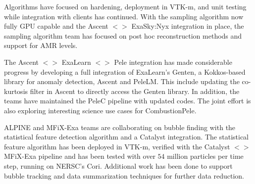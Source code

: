 
Algorithms have  focused on hardening, deployment in VTK-m, and unit testing while integration with clients has continued.  With the sampling algorithm now fully GPU capable and the Ascent $<>$ ExaSky:Nyx integration in place, the sampling algorithm team has focused on post hoc reconstruction methods and support for AMR levels.

The Ascent $<>$ ExaLearn $<>$ Pele integration has made considerable progress by developing a full integration of ExaLearn's Genten, a Kokkos-based library for anomaly detection, Ascent and PeleLM.  This include updating the co-kurtosis filter in Ascent to directly access the Genten library.  In addition, the teams have maintained the PeleC pipeline with updated codes.  The joint effort is also exploring interesting science use cases for CombustionPele.

ALPINE and MFiX-Exa teams are collaborating on bubble finding with the statistical feature detection algorithm and a Catalyst integration.  The statistical feature algorithm has been deployed in VTK-m, verified with the Catalyst $<>$ MFiX-Exa pipeline and has been tested with over $54$ million particles per time step, running on NERSC's Cori.  Additional work has been done to support bubble tracking and data summarization techniques for further data reduction.  

